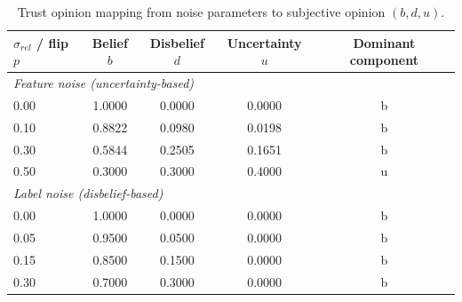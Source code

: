 \begin{table}[ht]
\centering
\caption{Trust opinion mapping from noise parameters to subjective opinion $(b, d, u)$.}
\label{tab:trust-mapping}
\begin{tabular}{lcccc}
\toprule
$\sigma_{rel}$ / flip $p$ & Belief $b$ & Disbelief $d$ & Uncertainty $u$ & Dominant component \\
\midrule
\multicolumn{5}{l}{\textit{Feature noise (uncertainty-based)}} \\
0.00 & 1.0000 & 0.0000 & 0.0000 & b \\
0.10 & 0.8822 & 0.0980 & 0.0198 & b \\
0.30 & 0.5844 & 0.2505 & 0.1651 & b \\
0.50 & 0.3000 & 0.3000 & 0.4000 & u \\
\midrule 
\multicolumn{5}{l}{\textit{Label noise (disbelief-based)}} \\
0.00 & 1.0000 & 0.0000 & 0.0000 & b \\
0.05 & 0.9500 & 0.0500 & 0.0000 & b \\
0.15 & 0.8500 & 0.1500 & 0.0000 & b \\
0.30 & 0.7000 & 0.3000 & 0.0000 & b \\
\bottomrule
\end{tabular}
\end{table}